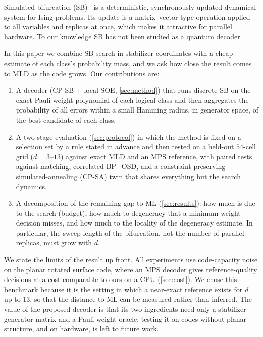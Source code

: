 \documentclass[journal]{IEEEtran}
\begin{document}
Simulated bifurcation (SB)~\cite{goto2019,goto2021} is a deterministic, synchronously updated dynamical system for Ising problems. Its update is a matrix--vector-type operation applied to all variables and replicas at once, which makes it attractive for parallel hardware. To our knowledge SB has not been studied as a quantum decoder.

In this paper we combine SB search in stabilizer coordinates with a cheap estimate of each class's probability mass, and we ask how close the result comes to MLD as the code grows. Our contributions are:

\begin{enumerate}
\item A decoder (CP-SB + local SOE, \cref{sec:method}) that runs discrete SB on the exact Pauli-weight polynomial of each logical class and then aggregates the probability of all errors within a small Hamming radius, in generator space, of the best candidate of each class.
\item A two-stage evaluation (\cref{sec:protocol}) in which the method is fixed on a selection set by a rule stated in advance and then tested on a held-out $54$-cell grid ($d=3$--$13$) against exact MLD and an MPS reference, with paired tests against matching, correlated BP+OSD, and a constraint-preserving simulated-annealing (CP-SA) twin that shares everything but the search dynamics.
\item A decomposition of the remaining gap to ML (\cref{sec:results}): how much is due to the search (budget), how much to degeneracy that a minimum-weight decision misses, and how much to the locality of the degeneracy estimate. In particular, the sweep length of the bifurcation, not the number of parallel replicas, must grow with $d$.
\end{enumerate}

We state the limits of the result up front. All experiments use code-capacity noise on the planar rotated surface code, where an MPS decoder gives reference-quality decisions at a cost comparable to ours on a CPU (\cref{sec:cost}). We chose this benchmark because it is the setting in which a near-exact reference exists for $d$ up to 13, so that the distance to ML can be measured rather than inferred. The value of the proposed decoder is that its two ingredients need only a stabilizer generator matrix and a Pauli-weight oracle; testing it on codes without planar structure, and on hardware, is left to future work.

\end{document}
